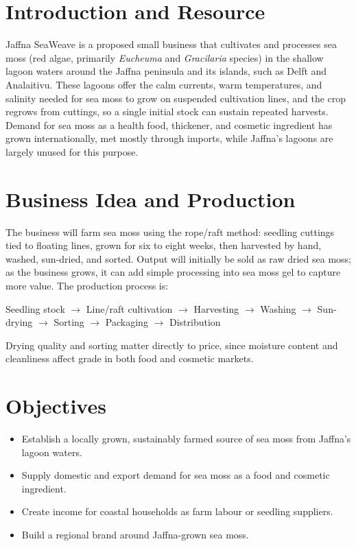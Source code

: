 




\section{Introduction and Resource}
Jaffna SeaWeave is a proposed small business that cultivates and processes sea moss (red algae, primarily \textit{Eucheuma} and \textit{Gracilaria} species) in the shallow lagoon waters around the Jaffna peninsula and its islands, such as Delft and Analaitivu. These lagoons offer the calm currents, warm temperatures, and salinity needed for sea moss to grow on suspended cultivation lines, and the crop regrows from cuttings, so a single initial stock can sustain repeated harvests. Demand for sea moss as a health food, thickener, and cosmetic ingredient has grown internationally, met mostly through imports, while Jaffna's lagoons are largely unused for this purpose.

\section{Business Idea and Production}
The business will farm sea moss using the rope/raft method: seedling cuttings tied to floating lines, grown for six to eight weeks, then harvested by hand, washed, sun-dried, and sorted. Output will initially be sold as raw dried sea moss; as the business grows, it can add simple processing into sea moss gel to capture more value. The production process is:

\begin{center}
Seedling stock $\rightarrow$ Line/raft cultivation $\rightarrow$ Harvesting $\rightarrow$ Washing $\rightarrow$ Sun-drying $\rightarrow$ Sorting $\rightarrow$ Packaging $\rightarrow$ Distribution
\end{center}

Drying quality and sorting matter directly to price, since moisture content and cleanliness affect grade in both food and cosmetic markets.

\section{Objectives}
\begin{itemize}
  \item Establish a locally grown, sustainably farmed source of sea moss from Jaffna's lagoon waters.
  \item Supply domestic and export demand for sea moss as a food and cosmetic ingredient.
  \item Create income for coastal households as farm labour or seedling suppliers.
  \item Build a regional brand around Jaffna-grown sea moss.
\end{itemize}

